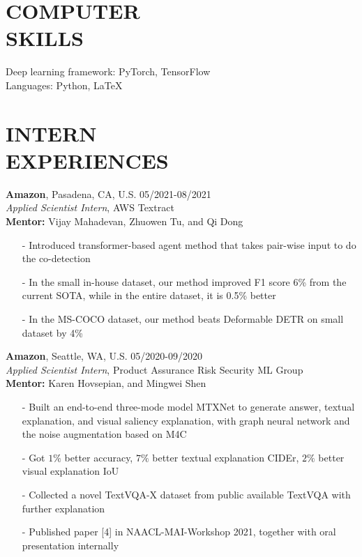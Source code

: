 \documentclass[margin]{res}
\begin{document}
\begin{resume}
\section{COMPUTER \\ SKILLS} 
                Deep learning framework: PyTorch, TensorFlow\\
                Languages: Python, \LaTeX
\vspace{-1em}
\section{INTERN \\ EXPERIENCES}
				\textbf{Amazon}, Pasadena, CA, U.S. \hfill 05/2021-08/2021\\
                {\it Applied Scientist Intern}, AWS Textract\\
                \textbf{Mentor:} Vijay Mahadevan, Zhuowen Tu, and Qi Dong
                \begin{itemize}\itemsep -2.2pt %
                \item[-] Introduced transformer-based agent method that takes pair-wise input to do the co-detection
                \item[-] In the small in-house dataset, our method improved F1 score 6\% from the current SOTA, while in the entire dataset, it is 0.5\% better
                \item[-] In the MS-COCO dataset, our method beats Deformable DETR on small dataset by 4\% 
                 \end{itemize}
                
                \vspace{-1em}
                \textbf{Amazon}, Seattle, WA, U.S. \hfill 05/2020-09/2020\\
                {\it Applied Scientist Intern}, Product Assurance Risk Security ML Group\\
                \textbf{Mentor:} Karen Hovsepian, and Mingwei Shen
                \begin{itemize}\itemsep -2.2pt %
                \item[-] Built an end-to-end three-mode model MTXNet to generate answer, textual explanation, and visual saliency explanation, with graph neural network and the noise augmentation based on M4C
                \item[-] Got $1\%$ better accuracy, $7\%$ better textual explanation CIDEr, $2\%$ better visual explanation IoU
                 \item[-] Collected a novel TextVQA-X dataset from public available TextVQA with further explanation
                 \item[-] Published paper [4] in NAACL-MAI-Workshop 2021, together with oral presentation internally
                 \end{itemize}
                

\end{resume}
\end{document}
